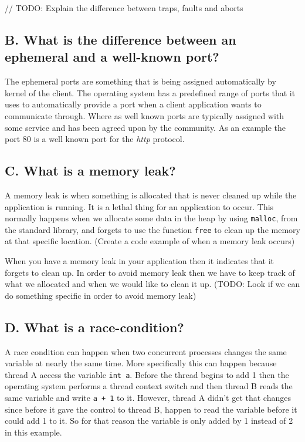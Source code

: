 \documentclass[11pt]{article}
\newcommand{\code}[1]{{\colorbox{lightgray!15}{\color{orange}\texttt{#1}}}}
\newcommand{\temp}[1]{{\color{red}#1}}
\begin{document}
// TODO: Explain the difference between traps, faults and aborts

\subsection{B. What is the difference between an ephemeral and a well-known port?}
The ephemeral ports are something that is being assigned automatically by kernel of the client. The operating system has a predefined range of ports that it uses to automatically provide a port when a client application wants to communicate through. 
Where as well known ports are typically assigned with some service and has been 
agreed upon by the community. As an example the port 80 is a well known port for the \textit{http} protocol.

\subsection{C. What is a memory leak?}
A memory leak is when something is allocated that is never cleaned up while the application is running. 
It is a lethal thing for an application to occur. This normally happens when we allocate some data in the heap
by using \code{malloc}, from the standard library, and forgets to use the function \code{free} to clean up the memory
at that specific location. \temp{(Create a code example of when a memory leak occurs)}

When you have a memory leak in your application then it indicates that it forgets to clean up.
In order to avoid memory leak then we have to keep track of what we allocated and when we would like to clean it up.
\temp{(TODO: Look if we can do something specific in order to avoid memory leak)}

\subsection{D. What is a race-condition?}
A race condition can happen when two concurrent processes changes the same variable at nearly the same time. 
More specifically this can happen because thread A access the variable \code{int a}. Before the thread begins to add 1 then the operating system performs a thread context switch and then thread B reads the same variable and write \code{a + 1} to it.
However, thread A didn't get that changes since before it gave the control to thread B, happen to read the variable before it could add 1 to it. So for that reason the variable is only added by 1 instead of 2 in this example.
\end{document}
